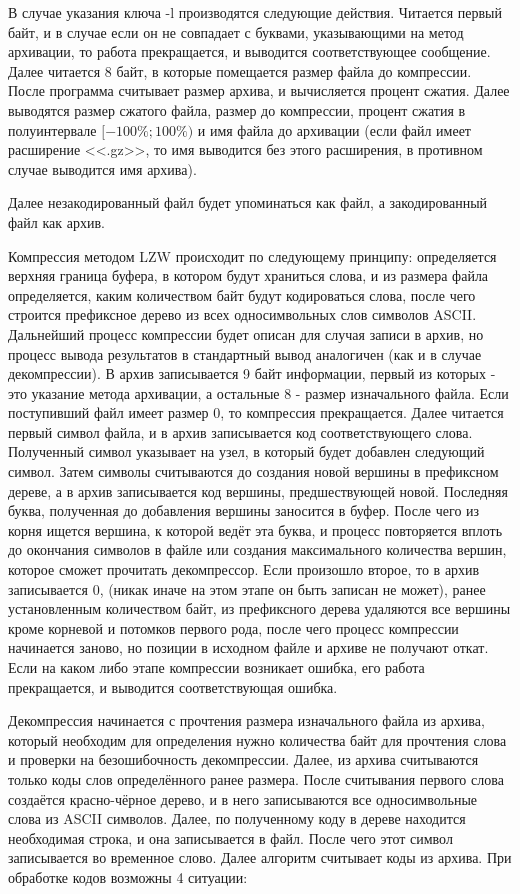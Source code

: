 \documentclass[12pt]{article}
\begin{document}
В случае указания ключа -l производятся следующие действия. Читается первый байт, и в случае если он не совпадает с буквами, указывающими на метод архивации, то работа прекращается, и выводится соответствующее сообщение. Далее читается 8 байт, в которые помещается размер файла до компрессии. После программа считывает размер архива, и вычисляется процент сжатия. Далее выводятся размер сжатого файла, размер до компрессии, процент сжатия в полуинтервале $[-100\%; 100\%)$ и имя файла до архивации (если файл имеет расширение <<.gz>>, то имя выводится без этого расширения, в противном случае выводится имя архива).

Далее незакодированный файл будет упоминаться как файл, а закодированный файл как архив.%

Компрессия методом LZW происходит по следующему принципу: определяется верхняя граница буфера, в котором будут храниться слова, и из размера файла определяется, каким количеством байт будут кодироваться слова, после чего строится префиксное дерево из всех односимвольных слов  символов ASCII. Дальнейший процесс компрессии будет описан для случая записи в архив, но процесс вывода результатов в стандартный вывод аналогичен (как и в случае декомпрессии). В архив записывается 9 байт информации, первый из которых - это указание метода архивации, а остальные 8 - размер изначального файла. Если поступивший файл имеет размер $0$, то компрессия прекращается. Далее читается первый символ файла, и в архив записывается код соответствующего слова. Полученный символ указывает на узел, в который будет добавлен следующий символ. Затем символы считываются до создания новой вершины в префиксном дереве, а в архив записывается код вершины, предшествующей новой. Последняя буква, полученная до добавления вершины заносится в буфер. После чего из корня ищется вершина, к которой ведёт эта буква, и процесс повторяется вплоть до окончания символов в файле или создания максимального количества вершин, которое сможет прочитать декомпрессор. Если произошло второе, то в архив записывается $0$, (никак иначе на этом этапе он быть записан не может), ранее установленным количеством байт, из префиксного дерева удаляются все вершины кроме корневой и потомков первого рода, после чего процесс компрессии начинается заново, но позиции в исходном файле и архиве не получают откат. Если на каком либо этапе компрессии возникает ошибка, его работа прекращается, и выводится соответствующая ошибка.

Декомпрессия начинается с прочтения размера изначального файла из архива, который необходим для определения нужно количества байт для прочтения слова и проверки на безошибочность декомпрессии. Далее, из архива считываются только коды слов определённого ранее размера. После считывания первого слова создаётся красно-чёрное дерево, и в него записываются все односимвольные слова из ASCII символов. Далее, по полученному коду в дереве находится необходимая строка, и она записывается в файл. После чего этот символ записывается во временное слово. Далее алгоритм считывает коды из архива. При обработке кодов возможны 4 ситуации:
\end{document}
